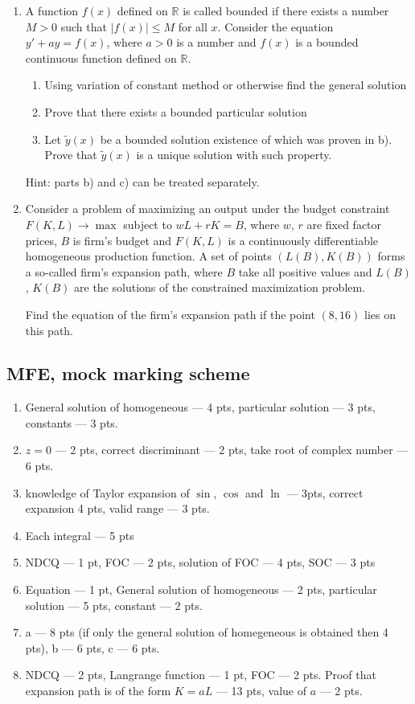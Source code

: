 \documentclass[12pt]{article} %
\theoremstyle{definition} %
\begin{document}
\begin{enumerate}[resume]
\item A function $f(x)$ defined on $\mathbb{R}$ is called bounded if there exists a number $M>0$ such that $|f(x)| \leq M$ for all $x$. Consider the equation $y'+ ay = f (x)$, where $a>0$ is a number and $f (x)$  is a bounded continuous function defined on $\mathbb{R}$.
\begin{enumerate}
\item Using variation of constant method or otherwise find the general solution
\item  Prove that there exists a bounded particular solution
\item Let $\tilde{y}(x)$  be a bounded solution existence of which was proven in b). Prove that $\tilde{y}(x)$ is a unique solution with such property.
\end{enumerate}
Hint: parts b) and c) can be treated separately.


\item Consider a problem of maximizing an output under the budget constraint $F(K,L) \to \max$ subject to $wL+rK=B$, where $w$, $r$ are fixed factor prices, $B$ is firm's budget and $F(K,L)$ is a continuously differentiable homogeneous production function. A set of points $(L(B),K(B))$ forms a so-called firm's expansion path, where $B$ take all positive values and $L(B)$, $K(B)$ are the solutions of the constrained maximization problem.

Find the equation of the firm's expansion path if the point $(8,16)$ lies on this path.
\end{enumerate}

\subsection{MFE, mock marking scheme}

\begin{enumerate}
\item General solution of homogeneous --- 4 pts, particular solution --- 3 pts, constants --- 3 pts.
\item $z=0$ --- 2 pts, correct discriminant  --- 2 pts, take root of complex number --- 6 pts.
\item knowledge of Taylor expansion of $\sin$, $\cos$ and $\ln$ --- 3pts, correct expansion 4 pts, valid range --- 3 pts.
\item Each integral --- 5 pts
\item NDCQ --- 1 pt, FOC --- 2 pts, solution of FOC --- 4 pts, SOC --- 3 pts
\item Equation --- 1 pt, General solution of homogeneous --- 2 pts, particular solution --- 5 pts, constant --- 2 pts.
\item a --- 8 pts (if only the general solution of homegeneous is obtained then 4 pts), b --- 6 pts, c --- 6 pts.
\item NDCQ --- 2 pts, Langrange function --- 1 pt, FOC --- 2 pts. Proof that expansion path is of the form $K=aL$ --- 13 pts, value of $a$ --- 2 pts.
\end{enumerate}
\end{document}
